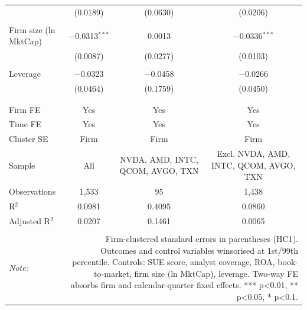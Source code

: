 \begin{table}[!htbp]
\begin{tabular}{@{\extracolsep{5pt}}lccc}
  & (0.0189) & (0.0630) & (0.0206) \\ 
  & & & \\ 
 Firm size (ln MktCap) & $-$0.0313$^{***}$ & 0.0013 & $-$0.0336$^{***}$ \\ 
  & (0.0087) & (0.0277) & (0.0103) \\ 
  & & & \\ 
 Leverage & $-$0.0323 & $-$0.0458 & $-$0.0266 \\ 
  & (0.0464) & (0.1759) & (0.0450) \\ 
  & & & \\ 
\hline \\[-1.8ex] 
Firm FE & Yes & Yes & Yes \\ 
Time FE & Yes & Yes & Yes \\ 
Cluster SE & Firm & Firm & Firm \\ 
Sample & All & NVDA, AMD, INTC, QCOM, AVGO, TXN & Excl. NVDA, AMD, INTC, QCOM, AVGO, TXN \\ 
Observations & 1,533 & 95 & 1,438 \\ 
R$^{2}$ & 0.0981 & 0.4095 & 0.0860 \\ 
Adjusted R$^{2}$ & 0.0207 & 0.1461 & 0.0065 \\ 
\hline 
\hline \\[-1.8ex] 
\textit{Note:}  & \multicolumn{3}{r}{Firm-clustered standard errors in parentheses (HC1). Outcomes and control variables winsorised at 1st/99th percentile. Controls: SUE score, analyst coverage, ROA, book-to-market, firm size (ln MktCap), leverage. Two-way FE absorbs firm and calendar-quarter fixed effects. *** p<0.01, ** p<0.05, * p<0.1.} \\ 
\end{tabular} 
\end{table} 
